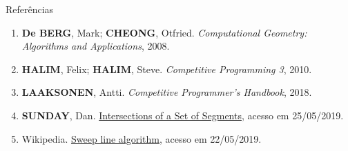 \begin{frame}[fragile]{Referências}

    \begin{enumerate}
        \item \textbf{De BERG}, Mark; \textbf{CHEONG}, Otfried. \textit{Computational Geometry: Algorithms and Applications}, 2008.

        \item \textbf{HALIM}, Felix; \textbf{HALIM}, Steve. \textit{Competitive Programming 3}, 2010.
        \item \textbf{LAAKSONEN}, Antti. \textit{Competitive Programmer's Handbook}, 2018.

        \item \textbf{SUNDAY}, Dan. \href{http://geomalgorithms.com/a09-_intersect-3.html}{Intersections of a Set of Segments}, acesso em 25/05/2019.

        \item Wikipedia. \href{https://en.wikipedia.org/wiki/Sweep_line_algorithm}{Sweep line algorithm}, acesso em 22/05/2019.

    \end{enumerate}

\end{frame}
